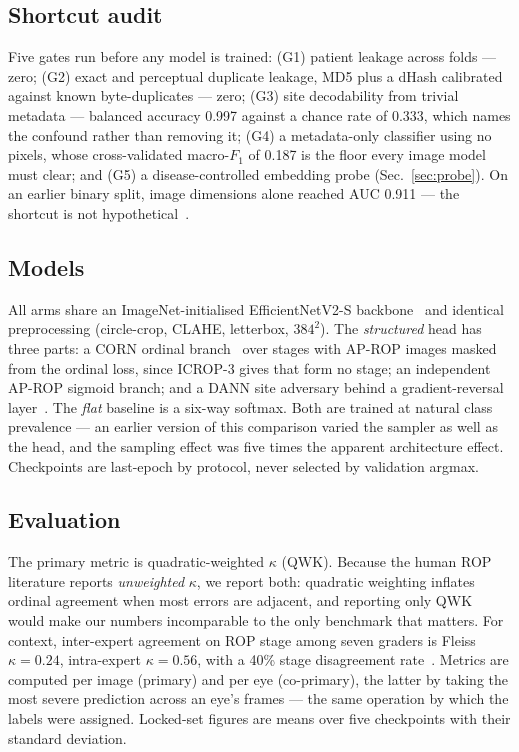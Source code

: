\documentclass{article}
\begin{document}
\subsection{Shortcut audit}
Five gates run before any model is trained: (G1) patient leakage across folds ---
zero; (G2) exact and perceptual duplicate leakage, MD5 plus a dHash calibrated
against known byte-duplicates --- zero; (G3) site decodability from trivial
metadata --- balanced accuracy 0.997 against a chance rate of 0.333, which names
the confound rather than removing it; (G4) a metadata-only classifier using no
pixels, whose cross-validated macro-$F_1$ of 0.187 is the floor every image model
must clear; and (G5) a disease-controlled embedding probe
(Sec.~\ref{sec:probe}). On an earlier binary split, image dimensions alone
reached AUC 0.911 --- the shortcut is not hypothetical~\cite{degrave2021}.

\subsection{Models}
All arms share an ImageNet-initialised EfficientNetV2-S
backbone~\cite{tan2021} and identical preprocessing (circle-crop, CLAHE,
letterbox, $384^2$). The \emph{structured} head has three parts: a CORN ordinal
branch~\cite{corn2023} over stages with AP-ROP images masked from the ordinal
loss, since ICROP-3 gives that form no stage; an independent AP-ROP sigmoid
branch; and a DANN site adversary behind a gradient-reversal
layer~\cite{ganin2016}. The \emph{flat} baseline is a six-way softmax. Both are
trained at natural class prevalence --- an earlier version of this comparison
varied the sampler as well as the head, and the sampling effect was five times
the apparent architecture effect. Checkpoints are last-epoch by protocol, never
selected by validation argmax.

\subsection{Evaluation}
The primary metric is quadratic-weighted $\kappa$ (QWK). Because the human ROP
literature reports \emph{unweighted} $\kappa$, we report both: quadratic
weighting inflates ordinal agreement when most errors are adjacent, and reporting
only QWK would make our numbers incomparable to the only benchmark that matters.
For context, inter-expert agreement on ROP stage among seven graders is Fleiss
$\kappa = 0.24$, intra-expert $\kappa = 0.56$, with a 40\% stage disagreement
rate~\cite{gschliesser2015,campbell2016}. Metrics are computed per image
(primary) and per eye (co-primary), the latter by taking the most severe
prediction across an eye's frames --- the same operation by which the labels were
assigned. Locked-set figures are means over five checkpoints with their standard
deviation.
\end{document}
